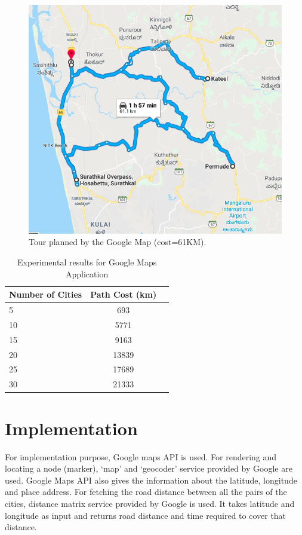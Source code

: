 \documentclass[conference]{IEEEtran}
\begin{document}
\begin{figure}[htbp]
\centerline{\includegraphics[width=\columnwidth]{tspResultGoogle.png}}
\caption{Tour planned by the Google Map (cost=61KM).}
\label{fig4}
\end{figure}

\begin{table}[h!]
  \begin{center}
    \label{tab:table4}
    \begin{tabular}{l|c|r}
      \textbf{Number of Cities} & \textbf{Path Cost (km)}\\
      \hline
      5 & 693\\
      10 & 5771\\
      15 & 9163\\
      20 & 13839\\ 
      25 & 17689\\
      30 & 21333\\
    \end{tabular}
    \caption{Experimental results for Google Maps Application}
  \end{center}
\end{table}


\section {Implementation}
For implementation purpose, Google maps API is used. For rendering and locating a node (marker), ‘map’ and ‘geocoder’ service provided by Google are used. Google Maps API also gives the information about the latitude, longitude and place address. For fetching the road distance between all the pairs of the cities, distance matrix service provided by Google is used. It takes latitude and longitude as input and returns road distance and time required to cover that distance.
\end{document}
